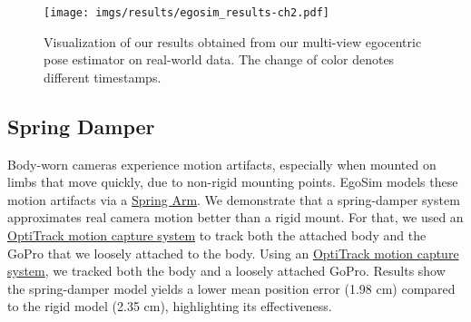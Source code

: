 \begin{figure}[b]
    \centering
    \texttt{[image: imgs/results/egosim\_results-ch2.pdf]}
    \caption{Visualization of our results obtained from our multi-view egocentric pose estimator on real-world data. The change of color denotes different timestamps.}
    \label{fig:predicted_poses}
\end{figure}



\subsection{Spring Damper}\label{sec:spring_damper}
Body-worn cameras experience motion artifacts, especially when mounted on limbs that move quickly, due to non-rigid mounting points.
EgoSim models these motion artifacts via a \href{https://dev.epicgames.com/documentation/en-us/unreal-engine/using-spring-arm-components-in-unreal-engine}{Spring Arm}.
We demonstrate that a spring-damper system approximates real camera motion better than a rigid mount.
For that, we used an \href{https://www.optitrack.com/cameras/primex-13/}{OptiTrack motion capture system} to track both the attached body and the GoPro that we loosely attached to the body.
Using an \href{https://www.optitrack.com/cameras/primex-13/}{OptiTrack motion capture system}, we tracked both the body and a loosely attached GoPro. 
Results show the spring-damper model yields a lower mean position error (1.98 cm) compared to the rigid model (2.35 cm), highlighting its effectiveness.
